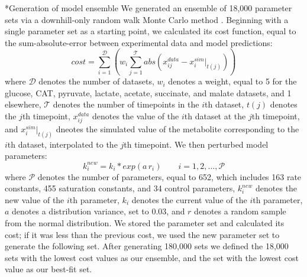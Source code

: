 \documentclass[12pt]{article}
\makeatletter
\renewcommand\subsection{\@startsection
	{subsection}{2}{0mm}
	{-0.05in}
	{-0.5\baselineskip}
	{\normalfont\normalsize\bfseries}}
\makeatother
\begin{document}
\subsection*{Generation of model ensemble}
We generated an ensemble of 18,000 parameter sets via a downhill-only random walk Monte Carlo method \cite{?}.
Beginning with a single parameter set as a starting point, we calculated its cost function, equal to the sum-absolute-error between experimental data and model predictions:
\begin{equation}\label{eqn:cost-function}
    cost=\sum_{i=1}^{\mathcal{D}}\left(w_i\sum_{j=1}^{\mathcal{T}}abs\left(x_{ij}^{data}-x_{i}^{sim}|_{t(j)}\right)\right)
\end{equation}
where $\mathcal{D}$ denotes the number of datasets, $w_i$ denotes a weight, equal to 5 for the glucose, CAT, pyruvate, lactate, acetate, succinate, and malate datasets, and 1 elsewhere, $\mathcal{T}$ denotes the number of timepoints in the $i$th dataset, $t(j)$ denotes the $j$th timepoint, $x_{ij}^{data}$ denotes the value of the $i$th dataset at the $j$th timepoint, and $x_{i}^{sim}|_{t(j)}$ dneotes the simulated value of the metabolite corresponding to the $i$th dataset, interpolated to the $j$th timepoint.
We then perturbed model parameters:
\begin{equation}\label{eqn:parameter-perturbation}
    k_i^{new}=k_i*exp(a\,r_i)\qquad{i=1,2,\hdots,\mathcal{P}}
\end{equation}
where $\mathcal{P}$ denotes the number of parameters, equal to 652, which includes 163 rate constants, 455 saturation constants, and 34 control parameters, $k_i^{new}$ denotes the new value of the $i$th parameter, $k_i$ denotes the current value of the $i$th parameter, $a$ denotes a distribution variance, set to 0.03, and $r$ denotes a random sample from the normal distribution.
We stored the parameter set and calculated its cost; if it was less than the previous cost, we used the new parameter set to generate the following set.
After generating 180,000 sets we defined the 18,000 sets with the lowest cost values as our ensemble, and the set with the lowest cost value as our best-fit set.
\end{document}
